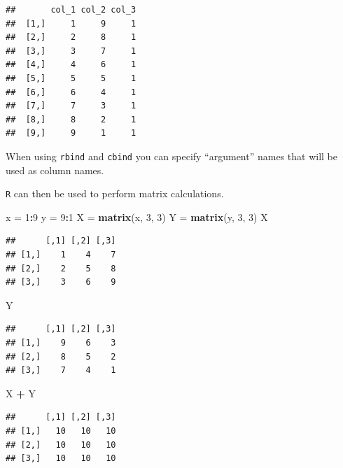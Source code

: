 \documentclass[]{book}
\newenvironment{Shaded}{\begin{snugshade}}{\end{snugshade}}
\newcommand{\KeywordTok}[1]{\textcolor[rgb]{0.13,0.29,0.53}{\textbf{#1}}}
\newcommand{\DecValTok}[1]{\textcolor[rgb]{0.00,0.00,0.81}{#1}}
\newcommand{\StringTok}[1]{\textcolor[rgb]{0.31,0.60,0.02}{#1}}
\newcommand{\OperatorTok}[1]{\textcolor[rgb]{0.81,0.36,0.00}{\textbf{#1}}}
\newcommand{\NormalTok}[1]{#1}
\theoremstyle{definition}
\theoremstyle{definition}
\theoremstyle{definition}
\theoremstyle{remark}
\begin{document}
\begin{verbatim}
##       col_1 col_2 col_3
##  [1,]     1     9     1
##  [2,]     2     8     1
##  [3,]     3     7     1
##  [4,]     4     6     1
##  [5,]     5     5     1
##  [6,]     6     4     1
##  [7,]     7     3     1
##  [8,]     8     2     1
##  [9,]     9     1     1
\end{verbatim}

When using \texttt{rbind} and \texttt{cbind} you can specify
``argument'' names that will be used as column names.

\texttt{R} can then be used to perform matrix calculations.

\begin{Shaded}
\begin{Highlighting}[]
\NormalTok{x =}\StringTok{ }\DecValTok{1}\OperatorTok{:}\DecValTok{9}
\NormalTok{y =}\StringTok{ }\DecValTok{9}\OperatorTok{:}\DecValTok{1}
\NormalTok{X =}\StringTok{ }\KeywordTok{matrix}\NormalTok{(x, }\DecValTok{3}\NormalTok{, }\DecValTok{3}\NormalTok{)}
\NormalTok{Y =}\StringTok{ }\KeywordTok{matrix}\NormalTok{(y, }\DecValTok{3}\NormalTok{, }\DecValTok{3}\NormalTok{)}
\NormalTok{X}
\end{Highlighting}
\end{Shaded}

\begin{verbatim}
##      [,1] [,2] [,3]
## [1,]    1    4    7
## [2,]    2    5    8
## [3,]    3    6    9
\end{verbatim}

\begin{Shaded}
\begin{Highlighting}[]
\NormalTok{Y}
\end{Highlighting}
\end{Shaded}

\begin{verbatim}
##      [,1] [,2] [,3]
## [1,]    9    6    3
## [2,]    8    5    2
## [3,]    7    4    1
\end{verbatim}

\begin{Shaded}
\begin{Highlighting}[]
\NormalTok{X }\OperatorTok{+}\StringTok{ }\NormalTok{Y}
\end{Highlighting}
\end{Shaded}

\begin{verbatim}
##      [,1] [,2] [,3]
## [1,]   10   10   10
## [2,]   10   10   10
## [3,]   10   10   10
\end{verbatim}
\end{document}
